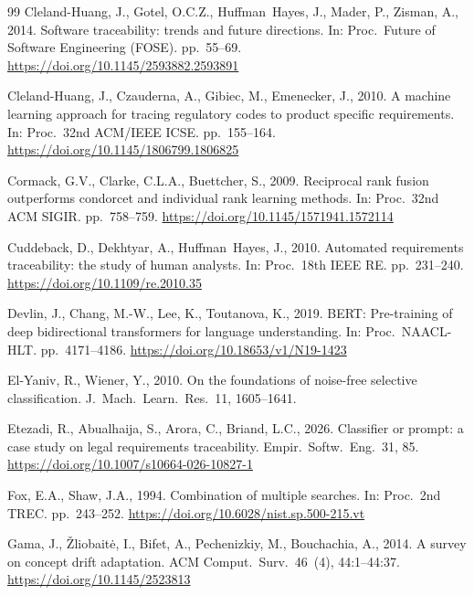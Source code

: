 \documentclass[a4paper,fleqn]{cas-sc}
\begin{document}
\begin{thebibliography}{99}
Cleland-Huang, J., Gotel, O.C.Z., Huffman~Hayes, J., Mader, P., Zisman, A., 2014. Software traceability: trends and future directions. In: Proc.\ Future of Software Engineering (FOSE). pp.\ 55--69. \url{https://doi.org/10.1145/2593882.2593891}

Cleland-Huang, J., Czauderna, A., Gibiec, M., Emenecker, J., 2010. A machine learning approach for tracing regulatory codes to product specific requirements. In: Proc.\ 32nd ACM/IEEE ICSE. pp.\ 155--164. \url{https://doi.org/10.1145/1806799.1806825}

Cormack, G.V., Clarke, C.L.A., Buettcher, S., 2009. Reciprocal rank fusion outperforms condorcet and individual rank learning methods. In: Proc.\ 32nd ACM SIGIR. pp.\ 758--759. \url{https://doi.org/10.1145/1571941.1572114}

Cuddeback, D., Dekhtyar, A., Huffman~Hayes, J., 2010. Automated requirements traceability: the study of human analysts. In: Proc.\ 18th IEEE RE. pp.\ 231--240. \url{https://doi.org/10.1109/re.2010.35}

Devlin, J., Chang, M.-W., Lee, K., Toutanova, K., 2019. BERT: Pre-training of deep bidirectional transformers for language understanding. In: Proc.\ NAACL-HLT. pp.\ 4171--4186. \url{https://doi.org/10.18653/v1/N19-1423}

El-Yaniv, R., Wiener, Y., 2010. On the foundations of noise-free selective classification. J.\ Mach.\ Learn.\ Res.\ 11, 1605--1641.

Etezadi, R., Abualhaija, S., Arora, C., Briand, L.C., 2026. Classifier or prompt: a case study on legal requirements traceability. Empir.\ Softw.\ Eng.\ 31, 85. \url{https://doi.org/10.1007/s10664-026-10827-1}

Fox, E.A., Shaw, J.A., 1994. Combination of multiple searches. In: Proc.\ 2nd TREC. pp.\ 243--252. \url{https://doi.org/10.6028/nist.sp.500-215.vt}

Gama, J., \v{Z}liobait\.{e}, I., Bifet, A., Pechenizkiy, M., Bouchachia, A., 2014. A survey on concept drift adaptation. ACM Comput.\ Surv.\ 46~(4), 44:1--44:37. \url{https://doi.org/10.1145/2523813}


\end{thebibliography}
\end{document}

